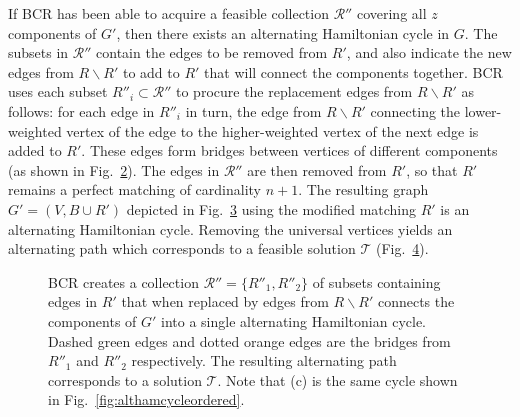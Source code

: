 \documentclass[a4paper,11pt,authoryear]{elsarticle}
\begin{document}
If BCR has been able to acquire a feasible collection $\mathcal{R}''$ covering all $z$ components of $G'$, then there exists an alternating Hamiltonian cycle in $G$. The subsets in $\mathcal{R}''$ contain the edges to be removed from $R'$, and also indicate the new edges from $R\backslash R'$ to add to $R'$ that will connect the components together. BCR uses each subset $R''_i \subset \mathcal{R}''$ to procure the replacement edges from $R\backslash R'$ as follows: for each edge in $R''_i$ in turn, the edge from $R \backslash R'$ connecting the lower-weighted vertex of the edge to the higher-weighted vertex of the next edge is added to $R'$. These edges form bridges between vertices of different components (as shown in Fig.~\ref{fig:mpsconnect}). The edges in $\mathcal{R}''$ are then removed from $R'$, so that $R'$ remains a perfect matching of cardinality $n+1$. The resulting graph $G'=(V, B \cup R')$ depicted in Fig.~\ref{fig:mpscycle} using the modified matching $R'$ is an alternating Hamiltonian cycle. Removing the universal vertices yields an alternating path which corresponds to a feasible solution $\mathcal{T}$ (Fig.~\ref{fig:solutionpath}).

\begin{figure}[h]	
	\centering
	\begin{subfigure}[h]{0.35\textwidth}
		
		\caption{}
		\label{fig:bcrlist}
	\end{subfigure} \hspace{7mm} %
	\begin{subfigure}[h]{0.25\textwidth}
		
		\caption{}
		\label{fig:mpsconnect}
	\end{subfigure} \hspace{7mm} %
	\begin{subfigure}[h]{0.25\textwidth}
		
		\caption{}
		\label{fig:mpscycle}
	\end{subfigure}
	\begin{subfigure}[h]{0.75\textwidth}
		
		\caption{}
		\label{fig:solutionpath}
	\end{subfigure}
	\caption{BCR creates a collection $\mathcal{R}'' = \{R''_1, R''_2\}$ of subsets containing edges in $R'$ that when replaced by edges from $R\backslash R'$ connects the components of $G'$ into a single alternating Hamiltonian cycle. Dashed green edges and dotted orange edges are the bridges from $R''_1$ and $R''_2$ respectively. The resulting alternating path corresponds to a solution $\mathcal{T}$. Note that (c) is the same cycle shown in Fig.~\ref{fig:althamcycleordered}.}
	\label{fig:bcr}
\end{figure}
\end{document}
